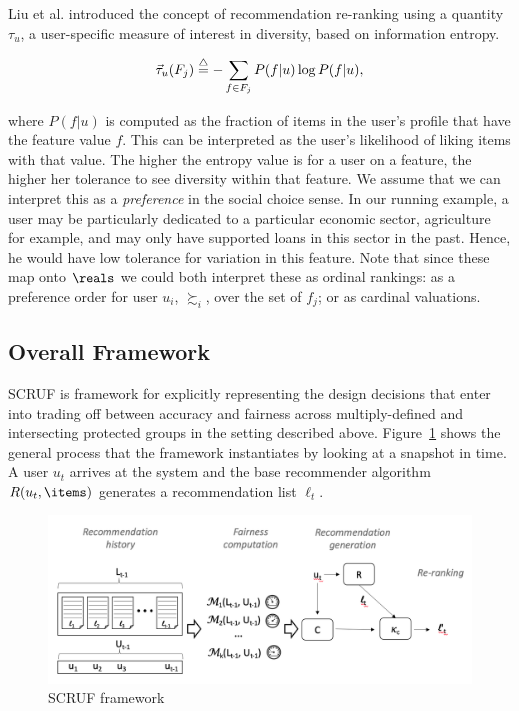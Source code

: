 Liu et al. \cite{liu2018personalizing,liu2019personalized} introduced the concept of recommendation re-ranking using a quantity $\tau_u$, a user-specific measure of interest in diversity, based on information entropy.

\begin{equation}
\vec{\tau}_u(F_{j})\buildrel\triangle\over=-\sum_{f \in F_j} P(f|u)\log P(f|u),
\label{eq:tau}
\end{equation}

where $P(f|u)$ is computed as the fraction of items in the user's profile that have the feature value $f$. This can be interpreted as the user's likelihood of liking items with that value. The higher the entropy value is for a user on a feature, the higher her tolerance to see diversity within that feature. We assume that we can interpret this as a \emph{preference} in the social choice sense. In our running example, a user may be particularly dedicated to a particular economic sector, agriculture for example, and may only have supported loans in this sector in the past.  Hence, he would have low tolerance for variation in this feature. Note that since these map onto $\reals$ we could both interpret these as ordinal rankings: as a preference order for user $u_i$, $\succsim_i$, over the set of $f_j$; or as cardinal valuations.

\subsection{Overall Framework}

SCRUF is framework for explicitly representing the design decisions that enter into trading off between accuracy and fairness across multiply-defined and intersecting protected groups in the setting described above. Figure~\ref{fig:framework} shows the general process that the framework instantiates by looking at a snapshot in time. A user $u_t$ arrives at the system and the base recommender algorithm $R(u_t,\items)$ generates a recommendation list $\ell_t$. 

\begin{figure}[tb]
    \centering
    \includegraphics[width=5in]{imgs/dynfair/process-graphic.png}
    \caption{SCRUF framework}
    \label{fig:framework}
\end{figure}

